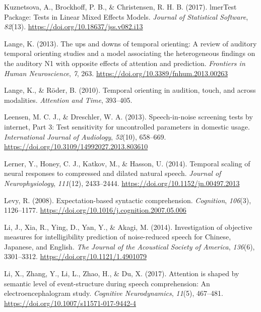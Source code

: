 \documentclass[a4paper, nobind]{templates/ociamthesis}
\newlength{\cslhangindent}
\newenvironment{CSLReferences}[2] %
 {%
  \setlength{\parindent}{0pt}
  \ifodd #1
  \let\oldpar\par
  \def\par{\hangindent=\cslhangindent\oldpar}
  \fi
  \setlength{\parskip}{1mm}
  \setlength{\baselineskip}{6mm}
 }%
 {}
\begin{document}
\begin{CSLReferences}{1}{0}
\leavevmode{}%
Kuznetsova, A., Brockhoff, P. B., \& Christensen, R. H. B. (2017). lmerTest Package: Tests in Linear Mixed Effects Models. \emph{Journal of Statistical Software}, \emph{82}(13). \url{https://doi.org/10.18637/jss.v082.i13}

\leavevmode{}%
Lange, K. (2013). {The ups and downs of temporal orienting: A review of auditory temporal orienting studies and a model associating the heterogeneous findings on the auditory N1 with opposite effects of attention and prediction}. \emph{Frontiers in Human Neuroscience}, \emph{7}, 263. \url{https://doi.org/10.3389/fnhum.2013.00263}

\leavevmode{}%
Lange, K., \& Röder, B. (2010). Temporal orienting in audition, touch, and across modalities. \emph{Attention and Time}, 393--405.

\leavevmode{}%
Leensen, M. C. J., \& Dreschler, W. A. (2013). {Speech-in-noise screening tests by internet, Part 3: Test sensitivity for uncontrolled parameters in domestic usage}. \emph{International Journal of Audiology}, \emph{52}(10), 658--669. \url{https://doi.org/10.3109/14992027.2013.803610}

\leavevmode{}%
Lerner, Y., Honey, C. J., Katkov, M., \& Hasson, U. (2014). {Temporal scaling of neural responses to compressed and dilated natural speech}. \emph{Journal of Neurophysiology}, \emph{111}(12), 2433--2444. \url{https://doi.org/10.1152/jn.00497.2013}

\leavevmode{}%
Levy, R. (2008). Expectation-based syntactic comprehension. \emph{Cognition}, \emph{106}(3), 1126--1177. \url{https://doi.org/10.1016/j.cognition.2007.05.006}

\leavevmode{}%
Li, J., Xia, R., Ying, D., Yan, Y., \& Akagi, M. (2014). {Investigation of objective measures for intelligibility prediction of noise-reduced speech for Chinese, Japanese, and English}. \emph{The Journal of the Acoustical Society of America}, \emph{136}(6), 3301--3312. \url{https://doi.org/10.1121/1.4901079}

\leavevmode{}%
Li, X., Zhang, Y., Li, L., Zhao, H., \& Du, X. (2017). {Attention is shaped by semantic level of event-structure during speech comprehension: An electroencephalogram study}. \emph{Cognitive Neurodynamics}, \emph{11}(5), 467--481. \url{https://doi.org/10.1007/s11571-017-9442-4}


\end{CSLReferences}
\end{document}
